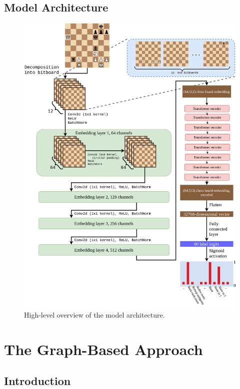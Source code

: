 \subsection{Model Architecture}

\begin{figure}[H]
        \centering
        \includegraphics[width=\textwidth]{project/img/ml_diagram.png}
        \caption{High-level overview of the model architecture.}
        \label{MLDiagram}
\end{figure}


\section{The Graph-Based Approach}\label{treesSection}

\subsection{Introduction}

